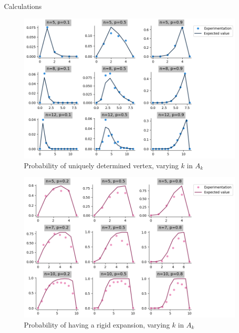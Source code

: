 \documentclass[handout]{beamer}
\theoremstyle{plain}
\begin{document}
\begin{frame}{Calculations}
    
\begin{figure}[h!]
	\centering
	\includegraphics[scale=0.35]{CHARLA_STOCHASTIC_TOPOLOGY_MCG_CIMATNOVEMBER_2018/fixed-uniq-det.png}
	\caption{Probability of uniquely determined vertex, varying $k$ in $A_k$}
\end{figure}
\end{frame}
\begin{frame}
\begin{figure}[h!]
	\centering
	\includegraphics[scale=0.35]{CHARLA_STOCHASTIC_TOPOLOGY_MCG_CIMATNOVEMBER_2018/rig-prob.png}
	\caption{Probability of having a rigid expansion,  varying $k$ in $A_k$}
\end{figure}
\end{frame}
\end{document}

